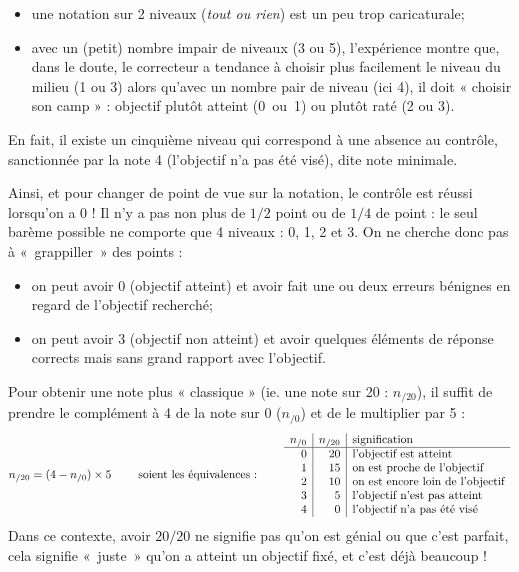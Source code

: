 \documentclass[11pt,a4paper,colorlinks,breaklinks]{article}
\begin{document}
\begin{itemize}
\item une notation sur 2 niveaux (\emph{tout ou rien}) est un peu trop caricaturale;
\item avec un (petit) nombre impair de niveaux (3 ou 5), l'expérience montre que, dans le doute, le correcteur a tendance à choisir plus facilement 	le niveau du milieu (1 ou 3) alors qu'avec un nombre pair de niveau (ici 4), il	doit « choisir son camp » : objectif plutôt atteint (0~ou~1) ou plutôt raté (2 ou 3).
\end{itemize}
En fait, il existe un cinquième niveau qui correspond à une absence au contrôle, sanctionnée par la note 4 (l'objectif n'a pas été visé), dite note minimale.	

Ainsi, et pour changer de point de vue sur la notation, le contrôle est réussi lorsqu'on a 0 ! Il n'y a pas non plus de $1/2$ point ou de $1/4$ de point : le seul barème possible ne comporte que 4 niveaux : 0, 1, 2 et 3. On ne cherche donc pas à «~grappiller~» des points : 
\begin{itemize}
\item on peut avoir 0 (objectif atteint) et avoir fait une ou deux erreurs bénignes en regard de l'objectif recherché;
\item on peut avoir 3 (objectif non atteint) et avoir quelques éléments de réponse corrects mais sans grand rapport avec l'objectif.
\end{itemize}
Pour obtenir une note plus « classique » (ie. une note sur 20 : $n_{/20}$), il suffit
de prendre le complément à 4 de la note sur 0 ($n_{/0}$) et de le multiplier par 5 :
$$n_{/20} = (4 - n_{/0})\times 5\hfill \makebox[5.25cm]{soient les équivalences :}\hfill
\begin{array}{r|r|l}
n_{/0} & n_{/20} & \mbox{signification} \\
\hline
0 & 20 & \mbox{l'objectif est atteint}\\
1 & 15 & \mbox{on est proche de l'objectif}\\
2 & 10 & \mbox{on est encore loin de l'objectif}\\
3 &  5 & \mbox{l'objectif n'est pas atteint}\\
4 &  0 & \mbox{l'objectif n'a pas été visé}
\end{array}$$
Dans ce contexte, avoir $20/20$ ne signifie pas qu'on est génial ou que c'est parfait,
cela signifie «~juste~» qu'on a atteint un objectif fixé, et c'est déjà beaucoup !

\end{document}
